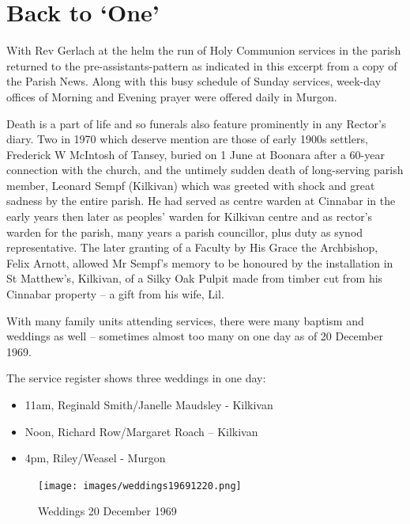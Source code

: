 \section{Back to `One'}

With Rev Gerlach at the helm the run of Holy Communion services in the
parish returned to the pre-assistants-pattern as indicated in this
excerpt from a copy of the Parish News. Along with this busy schedule of
Sunday services, week-day offices of Morning and Evening prayer were
offered daily in Murgon.

Death is a part of life and so funerals also feature prominently in any
Rector's diary. Two in 1970 which deserve mention are those of early
1900s settlers, Frederick W McIntosh of Tansey, buried on 1 June at
Boonara after a 60-year connection with the church, and the untimely
sudden death of long-serving parish member, Leonard Sempf (Kilkivan)
which was greeted with shock and great sadness by the entire parish. He
had served as centre warden at Cinnabar in the early years then later as
peoples' warden for Kilkivan centre and as rector's warden for the
parish, many years a parish councillor, plus duty as synod
representative. The later granting of a Faculty by His Grace the
Archbishop, Felix Arnott, allowed Mr Sempf's memory to be honoured by
the installation in St Matthew's, Kilkivan, of a Silky Oak Pulpit made
from timber cut from his Cinnabar property -- a gift from his wife, Lil.

With many family units attending services, there were many baptism and
weddings as well -- sometimes almost too many on one day as of 20
December 1969.

The service register shows three weddings in one day:

\begin{itemize}
\item
  11am, Reginald Smith/Janelle Maudsley - Kilkivan
\item
  Noon, Richard Row/Margaret Roach -- Kilkivan
\item
  4pm, Riley/Weasel - Murgon
\end{itemize}




\begin{figure}
\begin{center}
\texttt{[image: images/weddings19691220.png]}
\caption{Weddings 20 December 1969}
\end{center}
\end{figure}


